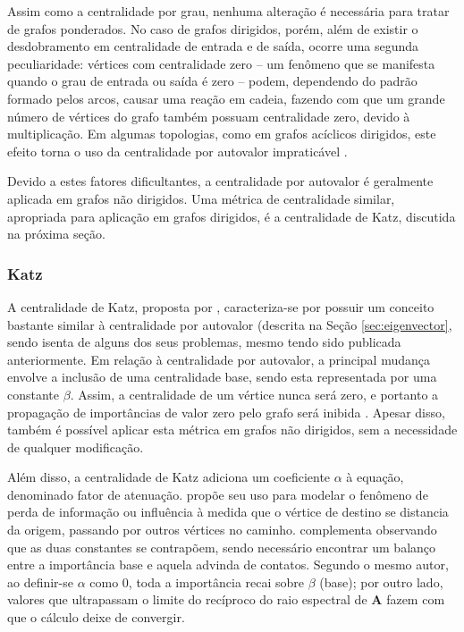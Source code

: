 Assim como a centralidade por grau, nenhuma alteração é necessária para tratar de grafos ponderados. No caso de grafos dirigidos, porém, além de existir o desdobramento em centralidade de entrada e de saída, ocorre uma segunda peculiaridade: vértices com centralidade zero -- um fenômeno que se manifesta quando o grau de entrada ou saída é zero -- podem, dependendo do padrão formado pelos arcos, causar uma reação em cadeia, fazendo com que um grande número de vértices do grafo também possuam centralidade zero, devido à multiplicação. Em algumas topologias, como em grafos acíclicos dirigidos, este efeito torna o uso da centralidade por autovalor impraticável \cite{Newman2010}.

Devido a estes fatores dificultantes, a centralidade por autovalor é geralmente aplicada em grafos não dirigidos. Uma métrica de centralidade similar, apropriada para aplicação em grafos dirigidos, é a centralidade de Katz, discutida na próxima seção.

\subsubsection{Katz} \label{sec:katz}

A centralidade de Katz, proposta por , caracteriza-se por possuir um conceito bastante similar à centralidade por autovalor (descrita na Seção \ref{sec:eigenvector}, sendo isenta de alguns dos seus problemas, mesmo tendo sido publicada anteriormente. Em relação à centralidade por autovalor, a principal mudança envolve a inclusão de uma centralidade base, sendo esta representada por uma constante $\beta$. Assim, a centralidade de um vértice nunca será zero, e portanto a propagação de importâncias de valor zero pelo grafo será inibida \cite{Newman2010}. Apesar disso, também é possível aplicar esta métrica em grafos não dirigidos, sem a necessidade de qualquer modificação.

Além disso, a centralidade de Katz adiciona um coeficiente $\alpha$ à equação, denominado fator de atenuação.  propõe seu uso para modelar o fenômeno de perda de informação ou influência à medida que o vértice de destino se distancia da origem, passando por outros vértices no caminho.  complementa observando que as duas constantes se contrapõem, sendo necessário encontrar um balanço entre a importância base e aquela advinda de contatos. Segundo o mesmo autor, ao definir-se $\alpha$ como 0, toda a importância recai sobre $\beta$ (base); por outro lado, valores que ultrapassam o limite do recíproco do raio espectral de $\mathbf{A}$ fazem com que o cálculo deixe de convergir.

